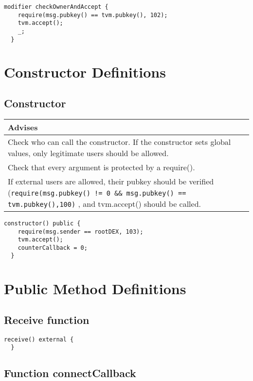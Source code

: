 \begin{lstlisting}[firstnumber=79]
  modifier checkOwnerAndAccept {
    require(msg.pubkey() == tvm.pubkey(), 102);
    tvm.accept();
    _;
  }
\end{lstlisting}

\section{Constructor Definitions}


\subsection{Constructor}

\ifsoldraft
\noindent\begin{tabular}{|p{12cm}|}\hline
\rowcolor{green}Advises
\\\hline
Check who can call the constructor. If the constructor sets global values, only legitimate users should be allowed.
\\\hline
Check that every argument is protected by a require().
\\\hline
If external users are allowed, their pubkey should be verified (\verb+require(msg.pubkey() != 0 && msg.pubkey() == tvm.pubkey(),100)+ , and tvm.accept() should be called.
\\\hline\end{tabular}
\fi


\begin{lstlisting}[firstnumber=85]
  constructor() public {
    require(msg.sender == rootDEX, 103);
    tvm.accept();
    counterCallback = 0;
  }
\end{lstlisting}

\section{Public Method Definitions}


\subsection{Receive function}



\begin{lstlisting}[firstnumber=413]
  receive() external {
  }
\end{lstlisting}

\subsection{Function connectCallback}


